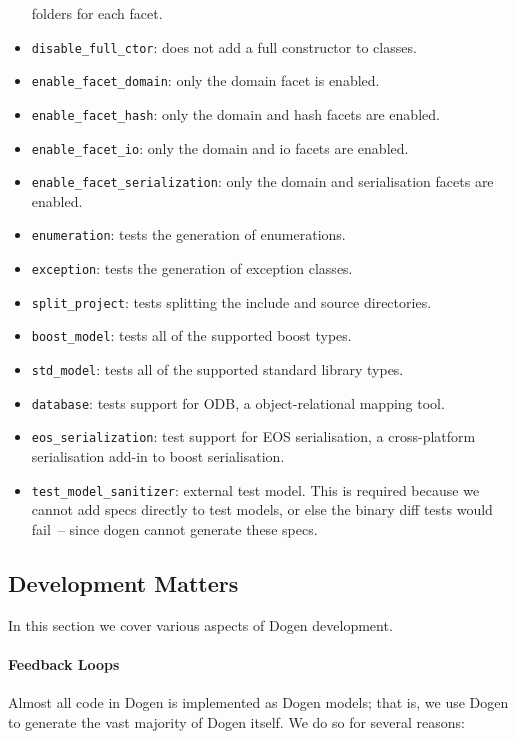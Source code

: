 \documentclass{book}
\begin{document}
\begin{itemize}
  folders for each facet.
\item \texttt{disable\_full\_ctor}: does not add a full constructor to
  classes.
\item \texttt{enable\_facet\_domain}: only the domain facet is
  enabled.
\item \texttt{enable\_facet\_hash}: only the domain and hash facets
  are enabled.
\item \texttt{enable\_facet\_io}: only the domain and io facets are
  enabled.
\item \texttt{enable\_facet\_serialization}: only the domain and
  serialisation facets are enabled.
\item \texttt{enumeration}: tests the generation of enumerations.
\item \texttt{exception}: tests the generation of exception classes.
\item \texttt{split\_project}: tests splitting the include and source
  directories.
\item \texttt{boost\_model}: tests all of the supported boost types.
\item \texttt{std\_model}: tests all of the supported standard library
  types.
\item \texttt{database}: tests support for ODB, a object-relational
  mapping tool.
\item \texttt{eos\_serialization}: test support for EOS serialisation,
  a cross-platform serialisation add-in to boost serialisation.
\item \texttt{test\_model\_sanitizer}: external test model. This is
  required because we cannot add specs directly to test models, or
  else the binary diff tests would fail~-- since dogen cannot generate
  these specs.
\end{itemize}

\subsection{Development Matters}

In this section we cover various aspects of Dogen development.

\paragraph{Feedback Loops}

Almost all code in Dogen is implemented as Dogen models; that is, we
use Dogen to generate the vast majority of Dogen itself. We do so for
several reasons:
\end{document}
